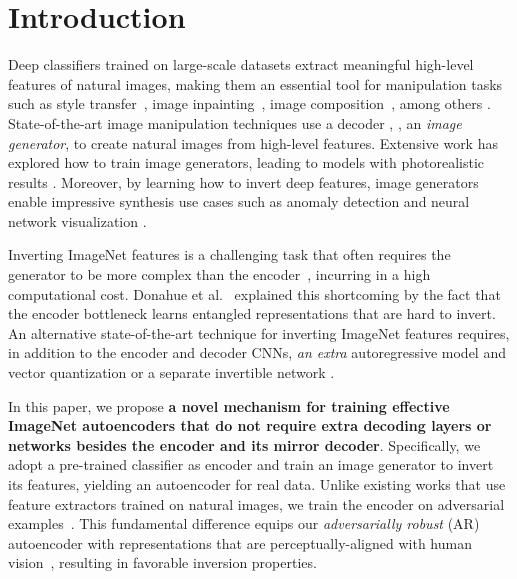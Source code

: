 \section{Introduction}
\label{sec:introduction}

Deep classifiers trained on large-scale datasets extract meaningful high-level features of natural images, making them an essential tool for manipulation tasks such as style transfer~\cite{gatys_2016_image,li_2017_universal,yoo_2019_photorealistic}, image inpainting~\cite{yang_2017_high,nguyen2017plug}, image composition~\cite{shocher_2020_semantic,nguyen2016synthesizing}, among others \cite{rombach_2020_network,santurkar_2019_image,zhang_2018_unreasonable}. State-of-the-art image manipulation techniques use a decoder \cite{nguyen2017plug,zhang_2018_unreasonable}, \ie, an \emph{image generator}, to create natural images from high-level features. Extensive work has explored how to train image generators, leading to models with photorealistic results \cite{goodfellow2016deep}. Moreover, by learning how to invert deep features, image generators enable impressive synthesis use cases such as anomaly detection \cite{deecke_2018_image,golan_2018_deep} and neural network visualization \cite{nguyen2016synthesizing,nguyen2019understanding,ponce2019evolving,rombach2022invertible}. 

Inverting ImageNet features is a challenging task that often requires the generator to be more complex than the encoder~\cite{bigbigan,dosovitskiy2015inverting,dosovitskiy_2016_generating,nguyen2017plug}, incurring in a high computational cost. Donahue et al.~\cite{bigbigan} explained this shortcoming by the fact that the encoder bottleneck learns entangled representations that are hard to invert. An alternative state-of-the-art technique for inverting ImageNet features requires, in addition to the encoder and decoder CNNs, \emph{an extra} autoregressive model and vector quantization \cite{esser2021taming,esser2021imagebart} or a separate invertible network \cite{rombach2022invertible}.

In this paper, we propose \textbf{a novel mechanism for training effective ImageNet autoencoders that do not require extra decoding layers or networks besides the encoder and its mirror decoder}. Specifically, we adopt a pre-trained classifier as encoder and train an image generator to invert its features, yielding an autoencoder for real data. Unlike existing works that use feature extractors trained on natural images, we train the encoder on adversarial examples~\cite{madry_2018_towards}. This fundamental difference equips our \emph{adversarially robust} (AR) autoencoder with representations that are perceptually-aligned with human vision~\cite{engstrom_2019_adversarial,santurkar_2019_image}, resulting in favorable inversion properties.

